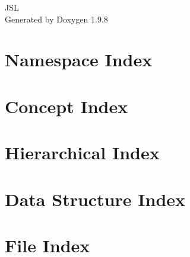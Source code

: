 \documentclass[twoside]{book}
\newcommand{\+}{\discretionary{\mbox{\scriptsize$\hookleftarrow$}}{}{}}
\newcommand{\clearemptydoublepage}{%
    \newpage{\pagestyle{empty}\cleardoublepage}%
  }
\begin{document}
  \raggedbottom
    \hypersetup{pageanchor=false,
                bookmarksnumbered=true,
                pdfencoding=unicode
               }
  \begin{titlepage}
  \vspace*{7cm}
  \begin{center}%
  {\Large JSL}\\
  \vspace*{1cm}
  {\large Generated by Doxygen 1.9.8}\\
  \end{center}
  \end{titlepage}
  \clearemptydoublepage
  \tableofcontents
  \clearemptydoublepage
  \hypersetup{pageanchor=true}
\chapter{Namespace Index}

\chapter{Concept Index}

\chapter{Hierarchical Index}

\chapter{Data Structure Index}

\chapter{File Index}

\end{document}
